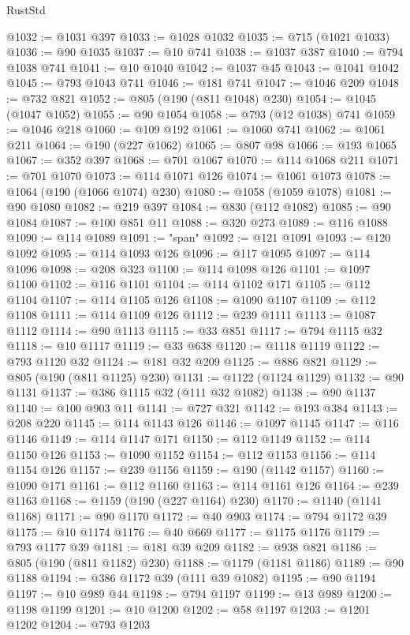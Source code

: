 \begin{lexlean}{RustStd}
\begin{coremodule}
{\begin{coremodule}
{{{{{{{{{{{{{{{{{{{{{{{{{{{{{{{{{{{{{{{{{{{{{{{{{{@1032 := @1031 @397
@1033 := @1028 @1032
@1035 := @715 (@1021 @1033)
@1036 := @90 @1035
@1037 := @10 @741
@1038 := @1037 @387
@1040 := @794 @1038 @741
@1041 := @10 @1040
@1042 := @1037 @45
@1043 := @1041 @1042
@1045 := @793 @1043 @741
@1046 := @181 @741
@1047 := @1046 @209
@1048 := @732 @821
@1052 := @805 (@190 (@811 @1048) @230)
@1054 := @1045 (@1047 @1052)
@1055 := @90 @1054
@1058 := @793 (@12 @1038) @741
@1059 := @1046 @218
@1060 := @109 @192
@1061 := @1060 @741
@1062 := @1061 @211
@1064 := @190 (@227 @1062)
@1065 := @807 @98
@1066 := @193 @1065
@1067 := @352 @397
@1068 := @701 @1067
@1070 := @114 @1068 @211
@1071 := @701 @1070
@1073 := @114 @1071 @126
@1074 := @1061 @1073
@1078 := @1064 (@190 (@1066 @1074) @230)
@1080 := @1058 (@1059 @1078)
@1081 := @90 @1080
@1082 := @219 @397
@1084 := @830 (@112 @1082)
@1085 := @90 @1084
@1087 := @100 @851 @11
@1088 := @320 @273
@1089 := @116 @1088
@1090 := @114 @1089
@1091 := "span"
@1092 := @121 @1091
@1093 := @120 @1092
@1095 := @114 @1093 @126
@1096 := @117 @1095
@1097 := @114 @1096
@1098 := @208 @323
@1100 := @114 @1098 @126
@1101 := @1097 @1100
@1102 := @116 @1101
@1104 := @114 @1102 @171
@1105 := @112 @1104
@1107 := @114 @1105 @126
@1108 := @1090 @1107
@1109 := @112 @1108
@1111 := @114 @1109 @126
@1112 := @239 @1111
@1113 := @1087 @1112
@1114 := @90 @1113
@1115 := @33 @851
@1117 := @794 @1115 @32
@1118 := @10 @1117
@1119 := @33 @638
@1120 := @1118 @1119
@1122 := @793 @1120 @32
@1124 := @181 @32 @209
@1125 := @886 @821
@1129 := @805 (@190 (@811 @1125) @230)
@1131 := @1122 (@1124 @1129)
@1132 := @90 @1131
@1137 := @386 @1115 @32 (@111 @32 @1082)
@1138 := @90 @1137
@1140 := @100 @903 @11
@1141 := @727 @321
@1142 := @193 @384
@1143 := @208 @220
@1145 := @114 @1143 @126
@1146 := @1097 @1145
@1147 := @116 @1146
@1149 := @114 @1147 @171
@1150 := @112 @1149
@1152 := @114 @1150 @126
@1153 := @1090 @1152
@1154 := @112 @1153
@1156 := @114 @1154 @126
@1157 := @239 @1156
@1159 := @190 (@1142 @1157)
@1160 := @1090 @171
@1161 := @112 @1160
@1163 := @114 @1161 @126
@1164 := @239 @1163
@1168 := @1159 (@190 (@227 @1164) @230)
@1170 := @1140 (@1141 @1168)
@1171 := @90 @1170
@1172 := @40 @903
@1174 := @794 @1172 @39
@1175 := @10 @1174
@1176 := @40 @669
@1177 := @1175 @1176
@1179 := @793 @1177 @39
@1181 := @181 @39 @209
@1182 := @938 @821
@1186 := @805 (@190 (@811 @1182) @230)
@1188 := @1179 (@1181 @1186)
@1189 := @90 @1188
@1194 := @386 @1172 @39 (@111 @39 @1082)
@1195 := @90 @1194
@1197 := @10 @989 @44
@1198 := @794 @1197
@1199 := @13 @989
@1200 := @1198 @1199
@1201 := @10 @1200
@1202 := @58 @1197
@1203 := @1201 @1202
@1204 := @793 @1203
}}}}}}}}}}}}}}}}}}}}}}}}}}}}}}}}}}}}}}}}}}}}}}}}}}
\end{coremodule}}
\end{coremodule}
\end{lexlean}
